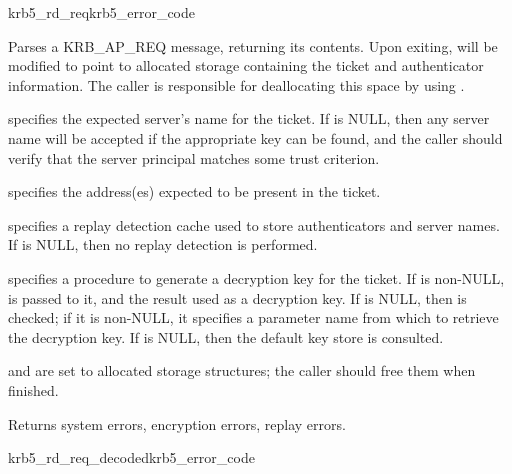 \begin{funcdecl}{krb5_rd_req}{krb5_error_code}{\funcin}
\funcendfuncarg
{}
\funcinout
{}
\funcout
{}
\end{funcdecl}

Parses a KRB_AP_REQ message, returning its contents.  Upon exiting,
 will be modified to point to allocated storage
containing the ticket and authenticator information.  The caller is
responsible for deallocating this space by using
.

 specifies the expected server's name for the ticket.
If  is NULL, then any server name will be accepted if
the appropriate key can be found, and the caller should verify that the
server principal matches some trust criterion.

 specifies the address(es) expected to be present
in the ticket.

 specifies a replay detection cache used to store
authenticators and server names.  If  is NULL, then no
replay detection is performed.

 specifies a procedure to generate a decryption key for the
ticket.  If  is non-NULL,  is
passed to it, and the result used as a decryption key. If
 is NULL, then  is checked; if
it is non-NULL, it specifies a parameter name from which to retrieve the
decryption key.  If  is NULL, then the default key
store is consulted.

 and
 are set to allocated storage
structures; the caller should free them when finished.

Returns system errors, encryption errors, replay errors.

\begin{funcdecl}{krb5_rd_req_decoded}{krb5_error_code}{\funcin}
\funcendfuncarg
{}
\funcout
{}
\end{funcdecl}


